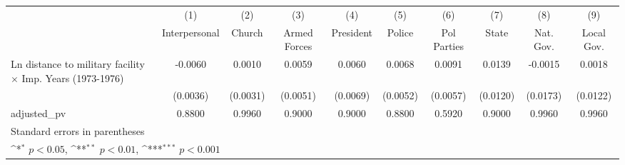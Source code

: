 {
\def\sym#1{\ifmmode^{#1}\else\(^{#1}\)\fi}
\begin{tabular}{l*{9}{c}}
\hline\hline
                    &\multicolumn{1}{c}{(1)}&\multicolumn{1}{c}{(2)}&\multicolumn{1}{c}{(3)}&\multicolumn{1}{c}{(4)}&\multicolumn{1}{c}{(5)}&\multicolumn{1}{c}{(6)}&\multicolumn{1}{c}{(7)}&\multicolumn{1}{c}{(8)}&\multicolumn{1}{c}{(9)}\\
                    &\multicolumn{1}{c}{Interpersonal}&\multicolumn{1}{c}{Church}&\multicolumn{1}{c}{Armed Forces}&\multicolumn{1}{c}{President}&\multicolumn{1}{c}{Police}&\multicolumn{1}{c}{Pol Parties}&\multicolumn{1}{c}{State}&\multicolumn{1}{c}{Nat. Gov.}&\multicolumn{1}{c}{Local Gov.}\\
\hline
Ln distance to military facility $\times$ Imp. Years (1973-1976)&     -0.0060         &      0.0010         &      0.0059         &      0.0060         &      0.0068         &      0.0091         &      0.0139         &     -0.0015         &      0.0018         \\
                    &    (0.0036)         &    (0.0031)         &    (0.0051)         &    (0.0069)         &    (0.0052)         &    (0.0057)         &    (0.0120)         &    (0.0173)         &    (0.0122)         \\
\hline
adjusted\_pv         &      0.8800         &      0.9960         &      0.9000         &      0.9000         &      0.8800         &      0.5920         &      0.9000         &      0.9960         &      0.9960         \\
\hline\hline
\multicolumn{10}{l}{\footnotesize Standard errors in parentheses}\\
\multicolumn{10}{l}{\footnotesize \sym{*} \(p<0.05\), \sym{**} \(p<0.01\), \sym{***} \(p<0.001\)}\\
\end{tabular}
}
